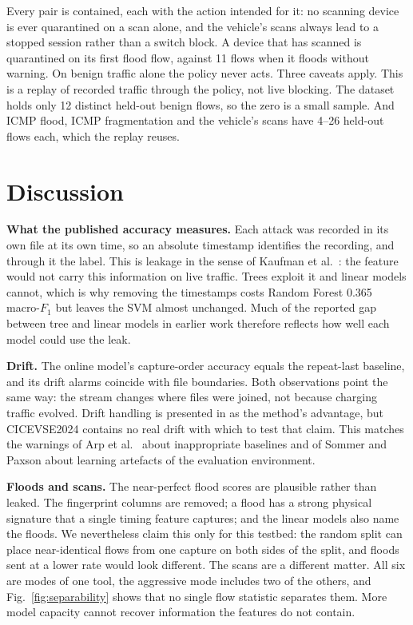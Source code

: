 \documentclass[preprint,12pt]{elsarticle}
\begin{document}
Every pair is contained, each with the action intended for it: no scanning device is ever quarantined on a scan alone, and the vehicle's scans always lead to a stopped session rather than a switch block. A device that has scanned is quarantined on its first flood flow, against 11 flows when it floods without warning. On benign traffic alone the policy never acts. Three caveats apply. This is a replay of recorded traffic through the policy, not live blocking. The dataset holds only 12 distinct held-out benign flows, so the zero is a small sample. And ICMP flood, ICMP fragmentation and the vehicle's scans have 4--26 held-out flows each, which the replay reuses.

\section{Discussion}
\label{sec:discussion}

\textbf{What the published accuracy measures.} Each attack was recorded in its own file at its own time, so an absolute timestamp identifies the recording, and through it the label. This is leakage in the sense of Kaufman et al.\ \cite{b10}: the feature would not carry this information on live traffic. Trees exploit it and linear models cannot, which is why removing the timestamps costs Random Forest 0.365 macro-$F_1$ but leaves the SVM almost unchanged. Much of the reported gap between tree and linear models in earlier work therefore reflects how well each model could use the leak.

\textbf{Drift.} The online model's capture-order accuracy equals the repeat-last baseline, and its drift alarms coincide with file boundaries. Both observations point the same way: the stream changes where files were joined, not because charging traffic evolved. Drift handling is presented in \cite{b4} as the method's advantage, but CICEVSE2024 contains no real drift with which to test that claim. This matches the warnings of Arp et al.\ \cite{b11} about inappropriate baselines and of Sommer and Paxson \cite{b13} about learning artefacts of the evaluation environment.

\textbf{Floods and scans.} The near-perfect flood scores are plausible rather than leaked. The fingerprint columns are removed; a flood has a strong physical signature that a single timing feature captures; and the linear models also name the floods. We nevertheless claim this only for this testbed: the random split can place near-identical flows from one capture on both sides of the split, and floods sent at a lower rate would look different. The scans are a different matter. All six are modes of one tool, the aggressive mode includes two of the others, and Fig.~\ref{fig:separability} shows that no single flow statistic separates them. More model capacity cannot recover information the features do not contain.
\end{document}
